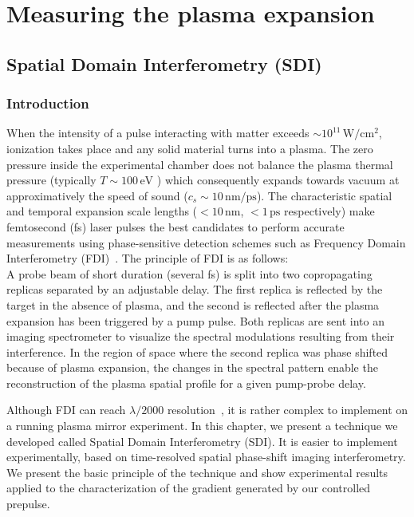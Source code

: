 \chapter{Measuring the plasma expansion}\label{ch:Measuring the gradient expansion}
\minitoc
\thispagestyle{empty}
\section{Spatial Domain Interferometry (SDI)}

\subsection{Introduction}

When the intensity of a pulse interacting with matter exceeds $\sim 10^{11}\,\mathrm{W/cm^2}$, ionization takes place and any solid material turns into a plasma. 
The zero pressure inside the experimental chamber does not balance the plasma thermal pressure (typically $T\sim 100\,\mathrm{eV}$ ) which consequently expands towards vacuum at approximatively the speed of sound ($c_s\sim 10\,\mathrm{nm/ps}$). 
 The characteristic spatial and temporal expansion scale lengths ($<10\,\mathrm{nm}$, $<1\,\mathrm{ps}$ respectively) make femtosecond (fs) laser pulses the best candidates to perform accurate measurements using phase-sensitive detection schemes such as Frequency Domain Interferometry (FDI)~\cite{Geindre1994,evans1996time,quoix2000ultrafast,audebert2001direct,geindre2001single}. The principle of FDI is as follows:\\
A probe beam of short duration (several fs) is split into two copropagating replicas separated by an adjustable delay. The first replica is reflected by the target in the absence of plasma, and the second is reflected after the plasma expansion has been triggered by a pump pulse. Both replicas are sent into an imaging spectrometer to visualize the spectral modulations resulting from their interference. In the region of space where the second replica was phase shifted because of plasma expansion, the changes in the spectral pattern enable the reconstruction of the plasma spatial profile for a given pump-probe delay.
 
 Although FDI can reach $\lambda /2000$ resolution~\cite{Geindre1994}, it is rather complex to implement on a running plasma mirror experiment. In this chapter, we present a technique we developed called Spatial Domain Interferometry (SDI). It is easier to implement experimentally, based on time-resolved spatial phase-shift imaging interferometry. We present the basic principle of the technique and show experimental results applied to the characterization of the gradient generated by our controlled prepulse.\\
 
